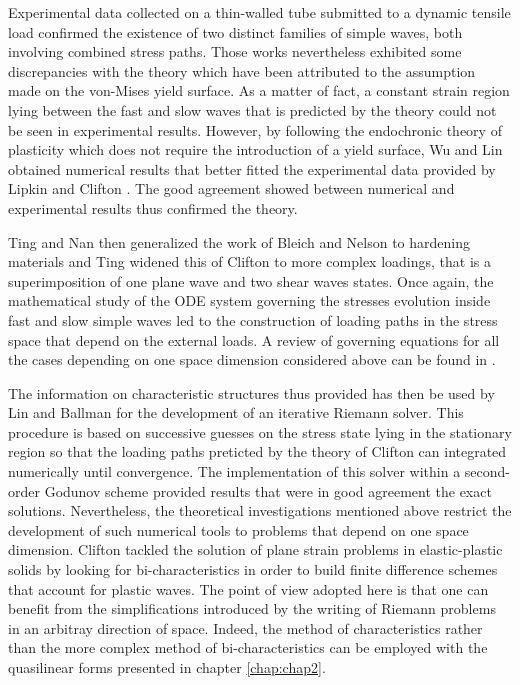 Experimental data collected on a thin-walled tube submitted to a dynamic tensile load \cite{Clifton_exp,Clifton_exp2} confirmed the existence of two distinct families of  simple waves, both involving combined stress paths.
Those works nevertheless exhibited some discrepancies with the theory which have been attributed to the assumption made on the von-Mises yield surface.
As a matter of fact, a constant strain region lying between the fast and slow waves that is predicted by the theory \cite{Clifton} could not be seen in experimental results.
However, by following the endochronic theory of plasticity \cite{Valanis} which does not require the introduction of a yield surface, Wu and Lin \cite{Wu_experimental} obtained numerical results that better fitted the experimental data provided by Lipkin and Clifton \cite{Clifton_exp2}.
The good agreement showed between numerical and experimental results \cite{Wu_experimental} thus confirmed the theory.

Ting and Nan \cite{Ting68} then generalized the work of Bleich and Nelson to hardening materials and Ting \cite{Ting69} widened this of Clifton to more complex loadings, that is a superimposition of one plane wave and two shear waves states.
Once again, the mathematical study of the ODE system governing the stresses evolution inside fast and slow simple waves led to the construction of loading paths in the stress space that depend on the external loads. A review of governing equations for all the cases depending on one space dimension considered above can be found in \cite{Nowacki}.

The information on characteristic structures thus provided has then be used by Lin and Ballman \cite{Lin_et_Ballman} for the development of an iterative Riemann solver.
This procedure is based on successive guesses on the stress state lying in the stationary region so that the loading paths preticted by the theory of Clifton \cite{Clifton} can integrated numerically until convergence.
The implementation of this solver within a second-order Godunov scheme provided results that were in good agreement the exact solutions.
Nevertheless, the theoretical investigations mentioned above restrict the development of such numerical tools to problems that depend on one space dimension.
Clifton tackled the solution of plane strain problems in elastic-plastic solids by looking for bi-characteristics \cite{Clifton_thesis} in order to build finite difference schemes that account for plastic waves.
The point of view adopted here is that one can benefit from the simplifications introduced by the writing of Riemann problems in an arbitray direction of space.
Indeed, the method of characteristics rather than the more complex method of bi-characteristics can be employed with the quasilinear forms presented in chapter \ref{chap:chap2}.




